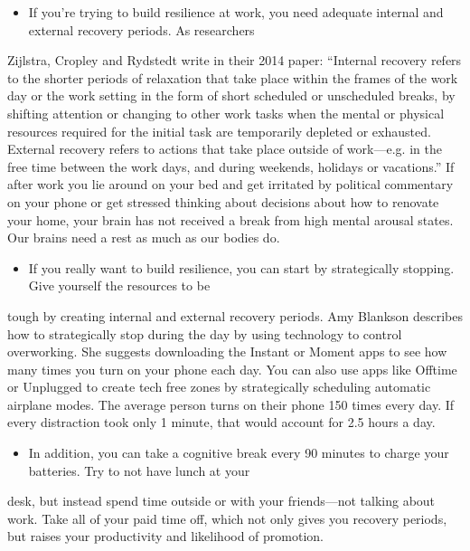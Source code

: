 \documentclass[UTF8,11pt]{ctexart}
\begin{document}
\begin{itemize}[leftmargin=2em,itemsep=.2em,topsep=.4em]\item[J.] If you’re trying to build resilience at work, you need adequate internal and external recovery periods. As researchers
\end{itemize}

Zijlstra, Cropley and Rydstedt write in their 2014 paper: “Internal recovery refers to the shorter periods of relaxation that take place within the frames of the work day or the work setting in the form of short scheduled or unscheduled breaks, by shifting attention or changing to other work tasks when the mental or physical resources required for the initial task are temporarily depleted or exhausted. External recovery refers to actions that take place outside of work—e.g. in the free time between the work days, and during weekends, holidays or vacations.” If after work you lie around on your bed and get irritated by political commentary on your phone or get stressed thinking about decisions about how to renovate your home, your brain has not received a break from high mental arousal states. Our brains need a rest as much as our bodies do.


\begin{itemize}[leftmargin=2em,itemsep=.2em,topsep=.4em]\item[K.] If you really want to build resilience, you can start by strategically stopping. Give yourself the resources to be
\end{itemize}

tough by creating internal and external recovery periods. Amy Blankson describes how to strategically stop during the day by using technology to control overworking. She suggests downloading the Instant or Moment apps to see how many times you turn on your phone each day. You can also use apps like Offtime or Unplugged to create tech free zones by strategically scheduling automatic airplane modes. The average person turns on their phone 150 times every day. If every distraction took only 1 minute, that would account for 2.5 hours a day.


\begin{itemize}[leftmargin=2em,itemsep=.2em,topsep=.4em]\item[L.] In addition, you can take a cognitive break every 90 minutes to charge your batteries. Try to not have lunch at your
\end{itemize}

desk, but instead spend time outside or with your friends—not talking about work. Take all of your paid time off, which not only gives you recovery periods, but raises your productivity and likelihood of promotion.
\end{document}
